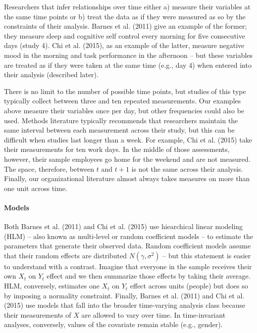 \documentclass[english,,man]{apa6}
\let\oldparagraph\paragraph
\renewcommand{\paragraph}[1]{\oldparagraph{#1}\mbox{}}
\theoremstyle{definition}
\theoremstyle{definition}
\theoremstyle{definition}
\theoremstyle{remark}
\begin{document}
Researchers that infer relationships over time either a) measure their
variables at the same time points or b) treat the data as if they were
measured as so by the constraints of their analysis. Barnes et al.
(2011) give an example of the former; they measure sleep and cognitive
self control every morning for five consecutive days (study 4). Chi et
al. (2015), as an example of the latter, measure negative mood in the
morning and task performance in the afternoon -- but these variables are
treated as if they were taken at the same time (e.g., day 4) when
entered into their analysis (described later).

There is no limit to the number of possible time points, but studies of
this type typically collect between three and ten repeated measurements.
Our examples above measure their variables once per day, but other
frequencies could also be used. Methods literature typically recommends
that researchers maintain the same interval between each measurement
across their study, but this can be difficult when studies last longer
than a week. For example, Chi et al. (2015) take their measurements for
ten work days. In the middle of those assessments, however, their sample
employees go home for the weekend and are not measured. The space,
therefore, between \(t\) and \(t + 1\) is not the same across their
analysis. Finally, our organizational literature almost always takes
measures on more than one unit across time.

\hypertarget{models}{%
\paragraph{Models}\label{models}}

Both Barnes et al. (2011) and Chi et al. (2015) use hiearchical linear
modeling (HLM) -- also known as multi-level or random coefficient models
-- to estimate the parameters that generate their observed data. Random
coefficient models assume that their random effects are distributed
\(N(\gamma, \sigma^2)\) -- but this statement is easier to understand
with a contrast. Imagine that everyone in the sample receives their own
\(X_t\) on \(Y_t\) effect and we then summarize those effects by taking
their average. HLM, conversely, estimates one \(X_t\) on \(Y_t\) effect
across units (people) but does so by imposing a normality constraint.
Finally, Barnes et al. (2011) and Chi et al. (2015) use models that fall
into the broader time-varying analysis class because their measurements
of \(X\) are allowed to vary over time. In time-invariant analyses,
conversely, values of the covariate remain stable (e.g., gender).
\end{document}
